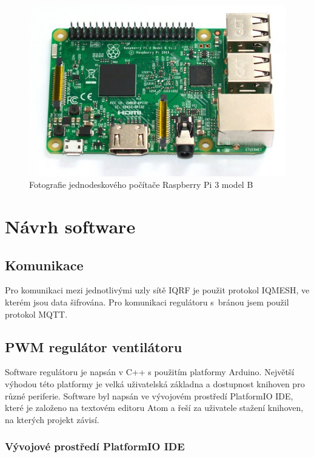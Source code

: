 \documentclass[12pt,a4paper]{article}
\begin{document}
\begin{figure}[H]
\centering
\label{fig:foto/rpi3}
\includegraphics[width = 128mm]{../img/foto/rpi3.jpg}
\caption{Fotografie jednodeskového počítače Raspberry Pi 3 model B}
\end{figure}

\newpage

\section{Návrh software}

\subsection{Komunikace}

Pro komunikaci mezi jednotlivými uzly sítě IQRF je použit protokol IQMESH, ve kterém jsou data šifrována. Pro komunikaci regulátoru s~bránou jsem použil protokol MQTT.

\subsection{PWM regulátor ventilátoru}

Software regulátoru je napsán v C++ s použitím platformy Arduino. Největší výhodou této platformy je velká uživatelská základna a dostupnost knihoven pro různé periferie. Software byl napsán ve vývojovém prostředí PlatformIO IDE\cite{sw/platformio-ide}, které je založeno na textovém editoru Atom\cite{sw/atom} a řeší za uživatele stažení knihoven, na kterých projekt závisí.

\subsubsection{Vývojové prostředí PlatformIO IDE}
\end{document}
